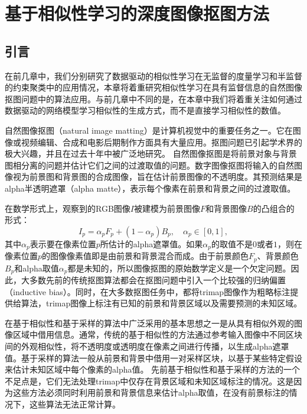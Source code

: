 \chapter{基于相似性学习的深度图像抠图方法}
\section{引言}
在前几章中，我们分别研究了数据驱动的相似性学习在无监督的度量学习和半监督的约束聚类中的应用情况，本章将着重研究相似性学习在具有监督信息的自然图像抠图问题中的算法应用。与前几章中不同的是，在本章中我们将着重关注如何通过数据驱动的网络模型学习相似性的生成方式，而不是直接学习相似性的数值。

自然图像抠图（natural image matting）是计算机视觉中的重要任务之一。它在图像或视频编辑、合成和电影后期制作方面具有大量应用\cite{wang2008image,aksoy2017designing,lutz2018alphagan,xu2017deep,samplenet}。抠图问题已引起学术界的极大兴趣，并且在过去十年中被广泛地研究。
自然图像抠图是将前景对象与背景图相分离的问题并估计它们之间的过渡取值的问题。数字图像抠图将输入的自然图像视为前景图和背景图的合成图像，旨在估计前景图像的不透明度。其预测结果是alpha半透明遮罩（alpha matte），表示每个像素在前景和背景之间的过渡取值\cite{wang2008image}。

在数学形式上，观察到的RGB图像$ I $被建模为前景图像$ F $和背景图像$ B $的凸组合的形式\cite{chuang2001bayesian,wang2008image}：
\begin{equation}
I_p = \alpha_pF_p + (1-\alpha_p)B_p, \quad \alpha_p \in [0,1],
\label{eq5:matting}
\end{equation}
其中$ \alpha_p $表示要在像素位置$ p $所估计的alpha遮罩值。如果$ \alpha_p $的取值不是$0$或者$1$，则在像素位置$p$的图像像素值即是由前景和背景混合而成。由于前景颜色$ F_p $、背景颜色$ B_p $和alpha取值$ \alpha_p $都是未知的，所以图像抠图的原始数学定义是一个欠定问题。因此，大多数先前的传统抠图算法都会在抠图问题中引入一个比较强的归纳偏置（inductive bias）。同时，在大多数抠图任务中，都将trimap图像作为粗略标注提供给算法，trimap图像上标注有已知的前景和背景区域以及需要预测的未知区域。

在基于相似性和基于采样的算法中广泛采用的基本思想之一是从具有相似外观的图像区域中借用信息。通常，传统的基于相似性的方法\cite{levin2008closed,he2010fast,chen2013knn,aksoy2017designing}通过参考输入图像中不同区块间的外观相似性，将不透明度或透明度在像素之间进行传播，以生成alpha遮罩值。基于采样的算法\cite{wang2007optimized,gastal2010shared,he2011global,feng2016cluster}一般从前景和背景中借用一对采样区块，以基于某些特定假设来估计未知区域中每个像素的alpha值。
先前基于相似性和基于采样的方法的一个不足点是，它们无法处理trimap中仅存在背景区域和未知区域标注的情况。这是因为这些方法必须同时利用前景和背景信息来估计alpha取值，在没有前景标注的情况下，这些算法无法正常计算。

